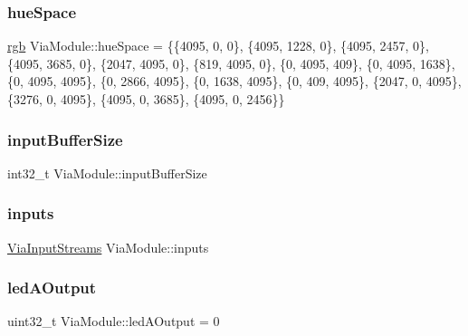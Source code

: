 \subsubsection{\texorpdfstring{hue\+Space}{hueSpace}}
{\footnotesize\ttfamily \mbox{\hyperlink{structrgb}{rgb}} Via\+Module\+::hue\+Space = \{\{4095, 0, 0\}, \{4095, 1228, 0\}, \{4095, 2457, 0\}, \{4095, 3685, 0\}, \{2047, 4095, 0\}, \{819, 4095, 0\}, \{0, 4095, 409\}, \{0, 4095, 1638\}, \{0, 4095, 4095\}, \{0, 2866, 4095\}, \{0, 1638, 4095\}, \{0, 409, 4095\}, \{2047, 0, 4095\}, \{3276, 0, 4095\}, \{4095, 0, 3685\}, \{4095, 0, 2456\}\}}

\mbox{\label{class_via_module_a23de5840e07f0b427bda2d44d116287f}} 
\subsubsection{\texorpdfstring{input\+Buffer\+Size}{inputBufferSize}}
{\footnotesize\ttfamily int32\+\_\+t Via\+Module\+::input\+Buffer\+Size}

\mbox{\label{class_via_module_af04f1c8df2a0302a9364dfb99a9085dc}} 
\subsubsection{\texorpdfstring{inputs}{inputs}}
{\footnotesize\ttfamily \mbox{\hyperlink{class_via_input_streams}{Via\+Input\+Streams}} Via\+Module\+::inputs}

\mbox{\label{class_via_module_a8bbc2b1b6b811030a29c54eb2267402d}} 
\subsubsection{\texorpdfstring{led\+A\+Output}{ledAOutput}\hspace{0.1cm}{\footnotesize\ttfamily [1/2]}}
{\footnotesize\ttfamily uint32\+\_\+t Via\+Module\+::led\+A\+Output = 0}

\mbox{\label{class_via_module_a87b482ee25e03764976b8f179081b383}} 
